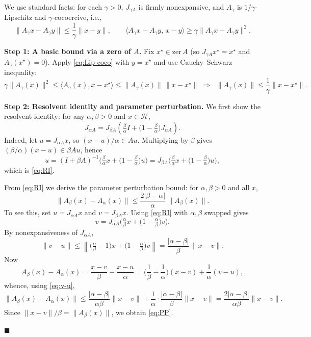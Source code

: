 \documentclass[11pt]{article}
\numberwithin{equation}{section}
\newenvironment{proof}{\bigskip\noindent{\bf Proof.}}{\hfill $\blacksquare$ \par\bigskip\noindent}
\begin{document}
\begin{proof}
We use standard facts: for each $\gamma>0$, $J_{\gamma A}$ is firmly nonexpansive, and $A_\gamma$ is $1/\gamma$-Lipschitz and $\gamma$-cocoercive, i.e.,
\begin{equation}\label{eq:Lip-coco}
\|A_\gamma x-A_\gamma y\|\le \frac{1}{\gamma}\|x-y\|, \qquad
\langle A_\gamma x-A_\gamma y,\,x-y\rangle \ge \gamma\|A_\gamma x-A_\gamma y\|^2 .
\end{equation}

\textbf{Step 1: A basic bound via a zero of $A$.}
Fix $x^{\star}\in\mathrm{zer}\,A$ (so $J_{\gamma A}x^{\star}=x^{\star}$ and $A_\gamma(x^{\star})=0$). Apply \eqref{eq:Lip-coco} with $y=x^{\star}$ and use Cauchy--Schwarz inequality:
\begin{equation}
\gamma\|A_\gamma(x)\|^2 \le \langle A_\gamma(x),x-x^{\star}\rangle
\le \|A_\gamma(x)\|\,\|x-x^{\star}\| \;\Rightarrow\;
{\;\|A_\gamma(x)\|\le \frac{1}{\gamma}\|x-x^{\star}\|.\;}
\label{eq:basic-bound}
\end{equation}

\textbf{Step 2: Resolvent identity and parameter perturbation.}
We first show the resolvent identity: for any $\alpha,\beta>0$ and $x\in\mathcal H$,
\begin{equation}\label{eq:RI}
{\quad
J_{\alpha A}
= J_{\beta A}\!\left(\tfrac{\beta}{\alpha}I+\Big(1-\tfrac{\beta}{\alpha}\Big)J_{\alpha A}\right).
\quad}
\end{equation}
Indeed, let $u=J_{\alpha A}x$, so $(x-u)/\alpha\in Au$. Multiplying by $\beta$ gives
$(\beta/\alpha)(x-u)\in \beta Au$, hence
\[
u=(I+\beta A)^{-1}\!\Big(\tfrac{\beta}{\alpha}x+\Big(1-\tfrac{\beta}{\alpha}\Big)u\Big)
=J_{\beta A}\!\Big(\tfrac{\beta}{\alpha}x+\Big(1-\tfrac{\beta}{\alpha}\Big)u\Big),
\]
which is \eqref{eq:RI}.

From \eqref{eq:RI} we derive the parameter perturbation bound: for $\alpha,\beta>0$ and all $x$,
\begin{equation}\label{eq:PP}
{\quad
\|A_\beta(x)-A_\alpha(x)\|
\le \frac{2|\beta-\alpha|}{\alpha}\,\|A_\beta(x)\| .
\quad}
\end{equation}
To see this, set $u=J_{\alpha A}x$ and $v=J_{\beta A}x$. Using \eqref{eq:RI} with $\alpha,\beta$ swapped gives
\[
v=J_{\alpha A}\!\Big(\tfrac{\alpha}{\beta}x+\Big(1-\tfrac{\alpha}{\beta}\Big)v\Big).
\]
By nonexpansiveness of $J_{\alpha A}$,
\begin{equation}\label{eq:v-u}
\|v-u\|
\le \left\|\Big(\tfrac{\alpha}{\beta}-1\Big)x+\Big(1-\tfrac{\alpha}{\beta}\Big)v\right\|
= \frac{|\alpha-\beta|}{\beta}\,\|x-v\|.
\end{equation}
Now
\[
A_\beta(x)-A_\alpha(x)
= \frac{x-v}{\beta}-\frac{x-u}{\alpha}
= \Big(\frac{1}{\beta}-\frac{1}{\alpha}\Big)(x-v) + \frac{1}{\alpha}(v-u),
\]
whence, using \eqref{eq:v-u},
\[
\|A_\beta(x)-A_\alpha(x)\|
\le \frac{|\alpha-\beta|}{\alpha\beta}\|x-v\|
+ \frac{1}{\alpha}\cdot \frac{|\alpha-\beta|}{\beta}\|x-v\|
= \frac{2|\alpha-\beta|}{\alpha\beta}\|x-v\|.
\]
Since $\|x-v\|/\beta=\|A_\beta(x)\|$, we obtain \eqref{eq:PP}.


\end{proof}
\end{document}
